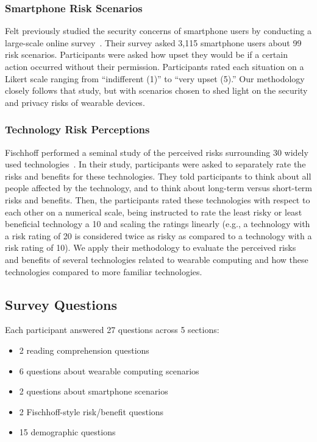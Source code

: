 \subsubsection{Smartphone Risk Scenarios}
Felt \etal previously studied the security concerns of smartphone users by conducting a large-scale online survey~\cite{Felt}. Their survey asked 3,115 smartphone users about 99 risk scenarios. Participants were asked how upset they would be if a certain action occurred without their permission. Participants rated each situation on a Likert scale ranging from ``indifferent (1)'' to ``very upset (5).''
Our methodology closely follows that study, but with scenarios chosen to shed light on the security and privacy risks of wearable devices.

\subsubsection{Technology Risk Perceptions}
Fischhoff \etal performed a seminal study of the perceived risks surrounding 30 widely used technologies~\cite{Fischhoff}. In their study, participants were asked to separately rate the risks and benefits for these technologies. They told participants to think about all people affected by the technology, and to think about long-term versus short-term risks and benefits. Then, the participants rated these technologies with respect to each other on a numerical scale, being instructed to rate the least risky or least beneficial technology a 10 and scaling the ratings linearly (e.g., a technology with a risk rating of 20 is considered twice as risky as compared to a technology with a risk rating of 10). We apply their methodology to evaluate the perceived risks and benefits of several technologies related to wearable computing and how these technologies compared to more familiar technologies.

\subsection{Survey Questions}
\noindent Each participant answered 27 questions across 5 sections:   \\[-.5cm]

\begin{itemize} \itemsep1pt \parskip0pt 
\item 2 reading comprehension questions
\item 6 questions about wearable computing scenarios 
\item 2 questions about smartphone scenarios 
\item 2 Fischhoff-style risk/benefit questions 
\item 15 demographic questions %
\end{itemize}

